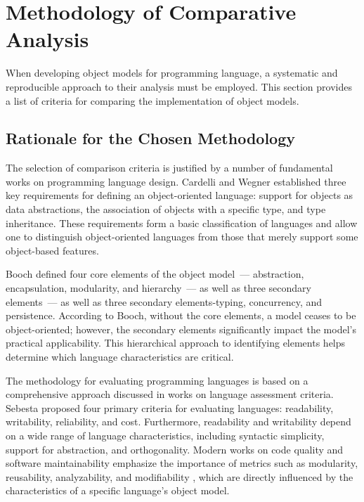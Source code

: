 \section{Methodology of Comparative Analysis}

When developing object models for programming language, a systematic and reproducible approach to their analysis must be employed. This section provides a list of criteria for comparing the implementation of object models.

\subsection{Rationale for the Chosen Methodology}

The selection of comparison criteria is justified by a number of fundamental works on programming language design. Cardelli and Wegner \cite{cardelli1985understanding} established three key requirements for defining an object-oriented language: support for objects as data abstractions, the association of objects with a specific type, and type inheritance. These requirements form a basic classification of languages and allow one to distinguish object-oriented languages from those that merely support some object-based features.

Booch \cite{booch2008object} defined four core elements of the object model~--- abstraction, encapsulation, modularity, and hierarchy~--- as well as three secondary elements~--- as well as three secondary elements-typing, concurrency, and persistence. According to Booch, without the core elements, a model ceases to be object-oriented; however, the secondary elements significantly impact the model's practical applicability. This hierarchical approach to identifying elements helps determine which language characteristics are critical.

The methodology for evaluating programming languages is based on a comprehensive approach discussed in works on language assessment criteria. Sebesta \cite{sebesta2016concepts} proposed four primary criteria for evaluating languages: readability, writability, reliability, and cost. Furthermore, readability and writability depend on a wide range of language characteristics, including syntactic simplicity, support for abstraction, and orthogonality. Modern works on code quality and software maintainability emphasize the importance of metrics such as modularity, reusability, analyzability, and modifiability \cite{iso25010}, which are directly influenced by the characteristics of a specific language's object model.

